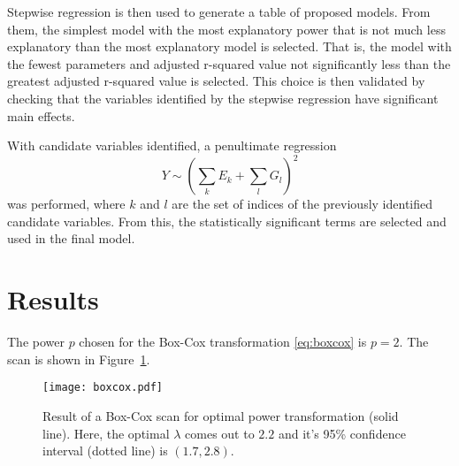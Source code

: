 \documentclass[12pt, letterpaper]{article}
\begin{document}
Stepwise regression is then used to generate a table of proposed models.
From them, the simplest model with the most explanatory power that is not much less explanatory than the most explanatory model is selected.
That is, the model with the fewest parameters and adjusted r-squared value not significantly less than the greatest adjusted r-squared value is selected.
This choice is then validated by checking that the variables identified by the stepwise regression have significant main effects.

With candidate variables identified, a penultimate regression
\begin{equation}
    Y \sim \left( \sum_k E_k + \sum_l G_l \right)^2
    \label{eq:M_2stage}
\end{equation}
was performed, where \(k\) and \(l\) are the set of indices of the previously identified candidate variables.
From this, the statistically significant terms are selected and used in the final model.

\section{Results}
The power \(p\) chosen for the Box-Cox transformation \eqref{eq:boxcox} is \(p = 2\). The scan is shown in Figure~\ref{fig:boxcox}.
\begin{figure}
    \texttt{[image: boxcox.pdf]}
    \caption{
        Result of a Box-Cox scan for optimal power transformation (solid line).
        Here, the optimal \(\lambda\) comes out to \(2.2\) and it's 95\% confidence interval (dotted line) is \(\left(1.7, 2.8\right)\).
    }
    \label{fig:boxcox}
\end{figure}
\end{document}
